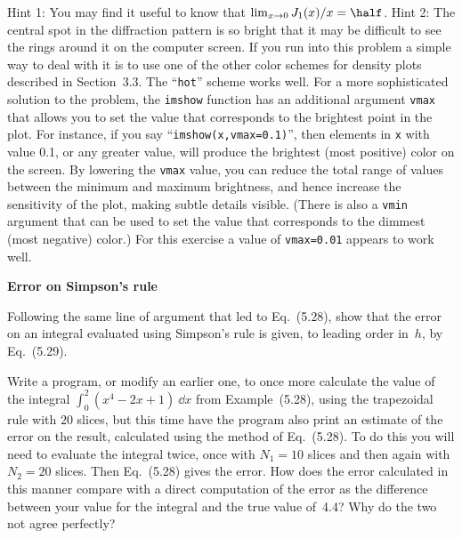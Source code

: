 \documentclass[12pt]{article}
\begin{document}
\begin{exercises}
\noindent Hint 1: You may find it useful to know that $\lim_{x\to0}
J_1(x)/x = \half$.  Hint 2: The central spot in the diffraction pattern is
so bright that it may be difficult to see the rings around it on the
computer screen.  If you run into this problem a simple way to deal with it
is to use one of the other color schemes for density plots described in
Section~3.3.  The ``\verb|hot|'' scheme works well.  For a more
sophisticated solution to the problem, the \verb|imshow| function has an
additional argument \verb|vmax| that allows you to set the value that
corresponds to the brightest point in the plot.  For instance, if you say
``\verb|imshow(x,vmax=0.1)|'', then elements in \verb|x| with value 0.1, or
any greater value, will produce the brightest (most positive) color on the
screen.  By lowering the \verb|vmax| value, you can reduce the total range
of values between the minimum and maximum brightness, and hence increase
the sensitivity of the plot, making subtle details visible.  (There is also
a \verb|vmin| argument that can be used to set the value that corresponds
to the dimmest (most negative) color.)  For this exercise a value of
\verb|vmax=0.01| appears to work well.



\exercise \textbf{Error on Simpson's rule}

\exskip Following the same line of argument that led to Eq.~(5.28), show
that the error on an integral evaluated using Simpson's rule is given, to
leading order in~$h$, by Eq.~(5.29).



\exercise Write a program, or modify an earlier one, to once more calculate
the value of the integral $\int_0^2 (x^4 - 2x + 1) \>\dd x$ from
Example~(5.28), using the trapezoidal rule with $20$ slices, but this time
have the program also print an estimate of the error on the result,
calculated using the method of Eq.~(5.28).  To do this you will need to
evaluate the integral twice, once with $N_1=10$ slices and then again with
$N_2=20$ slices.  Then Eq.~(5.28) gives the error.  How does the error
calculated in this manner compare with a direct computation of the error as
the difference between your value for the integral and the true value
of~4.4?  Why do the two not agree perfectly?




\end{exercises}
\end{document}
